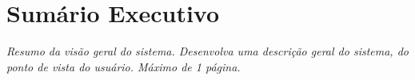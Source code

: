 \section{Sumário Executivo}

\textit{Resumo da visão geral do sistema. Desenvolva uma descrição geral do sistema, do ponto de vista do usuário. Máximo de 1 página.}
